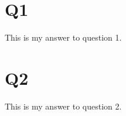 \documentclass{article}
\begin{document}
\section{Q1}
This is my answer to question 1.

\section{Q2}
This is my answer to question 2.
\end{document}
